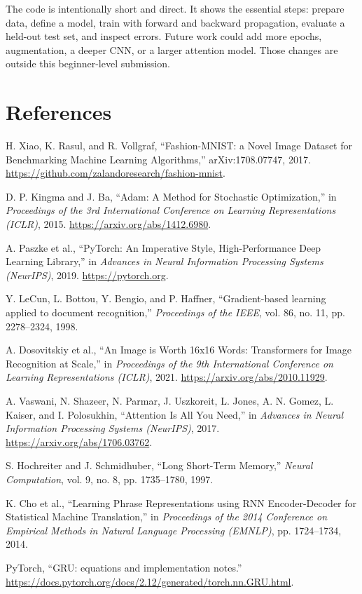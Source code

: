 \documentclass[oneside]{hcmut-report}
\begin{document}
The code is intentionally short and direct. It shows the essential steps: prepare data, define a model, train with forward and backward propagation, evaluate a held-out test set, and inspect errors. Future work could add more epochs, augmentation, a deeper CNN, or a larger attention model. Those changes are outside this beginner-level submission.

\clearpage
\section*{References}
\begin{enumerate}[leftmargin=7mm,label={[\arabic*]}]
  \item H. Xiao, K. Rasul, and R. Vollgraf, ``Fashion-MNIST: a Novel Image Dataset for Benchmarking Machine Learning Algorithms,'' arXiv:1708.07747, 2017. \url{https://github.com/zalandoresearch/fashion-mnist}.
  \item D. P. Kingma and J. Ba, ``Adam: A Method for Stochastic Optimization,'' in \textit{Proceedings of the 3rd International Conference on Learning Representations (ICLR)}, 2015. \url{https://arxiv.org/abs/1412.6980}.
  \item A. Paszke et al., ``PyTorch: An Imperative Style, High-Performance Deep Learning Library,'' in \textit{Advances in Neural Information Processing Systems (NeurIPS)}, 2019. \url{https://pytorch.org}.
  \item Y. LeCun, L. Bottou, Y. Bengio, and P. Haffner, ``Gradient-based learning applied to document recognition,'' \textit{Proceedings of the IEEE}, vol. 86, no. 11, pp. 2278--2324, 1998.
  \item A. Dosovitskiy et al., ``An Image is Worth 16x16 Words: Transformers for Image Recognition at Scale,'' in \textit{Proceedings of the 9th International Conference on Learning Representations (ICLR)}, 2021. \url{https://arxiv.org/abs/2010.11929}.
  \item A. Vaswani, N. Shazeer, N. Parmar, J. Uszkoreit, L. Jones, A. N. Gomez, L. Kaiser, and I. Polosukhin, ``Attention Is All You Need,'' in \textit{Advances in Neural Information Processing Systems (NeurIPS)}, 2017. \url{https://arxiv.org/abs/1706.03762}.
  \item S. Hochreiter and J. Schmidhuber, ``Long Short-Term Memory,'' \textit{Neural Computation}, vol. 9, no. 8, pp. 1735--1780, 1997.
  \item K. Cho et al., ``Learning Phrase Representations using RNN Encoder-Decoder for Statistical Machine Translation,'' in \textit{Proceedings of the 2014 Conference on Empirical Methods in Natural Language Processing (EMNLP)}, pp. 1724--1734, 2014.
  \item PyTorch, ``GRU: equations and implementation notes.'' \url{https://docs.pytorch.org/docs/2.12/generated/torch.nn.GRU.html}.
\end{enumerate}
\end{document}
